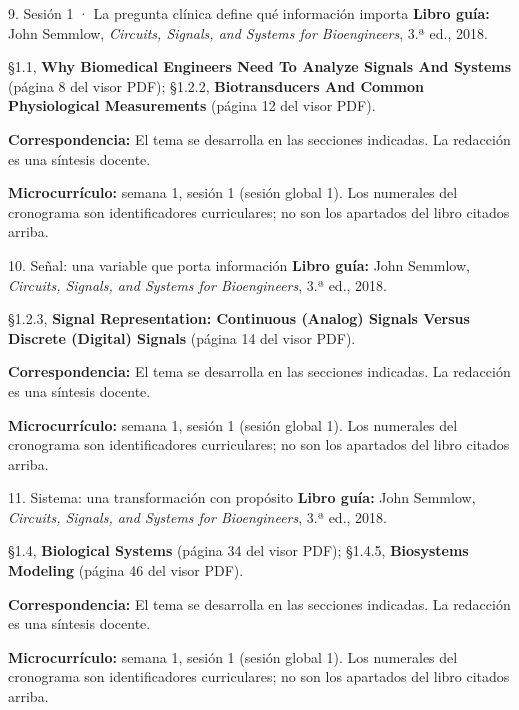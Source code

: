 \documentclass[
  10pt,
  ignorenonframetext,
  aspectratio=169,
  spanish,
]{beamer}
\begin{document}
\begin{frame}{9. Sesión 1 · La pregunta clínica define qué información
importa}
\label{sesiuxf3n-1-la-pregunta-cluxednica-define-quuxe9-informaciuxf3n-importa}
\textbf{Libro guía:} John Semmlow, \emph{Circuits, Signals, and Systems
for Bioengineers}, 3.ª ed., 2018.

§1.1, \textbf{Why Biomedical Engineers Need To Analyze Signals And
Systems} (página 8 del visor PDF); §1.2.2, \textbf{Biotransducers And
Common Physiological Measurements} (página 12 del visor PDF).

\textbf{Correspondencia:} El tema se desarrolla en las secciones
indicadas. La redacción es una síntesis docente.

\textbf{Microcurrículo:} semana 1, sesión 1 (sesión global 1). Los
numerales del cronograma son identificadores curriculares; no son los
apartados del libro citados arriba.
\end{frame}

\begin{frame}{10. Señal: una variable que porta información}
\label{seuxf1al-una-variable-que-porta-informaciuxf3n}
\textbf{Libro guía:} John Semmlow, \emph{Circuits, Signals, and Systems
for Bioengineers}, 3.ª ed., 2018.

§1.2.3, \textbf{Signal Representation: Continuous (Analog) Signals
Versus Discrete (Digital) Signals} (página 14 del visor PDF).

\textbf{Correspondencia:} El tema se desarrolla en las secciones
indicadas. La redacción es una síntesis docente.

\textbf{Microcurrículo:} semana 1, sesión 1 (sesión global 1). Los
numerales del cronograma son identificadores curriculares; no son los
apartados del libro citados arriba.
\end{frame}

\begin{frame}{11. Sistema: una transformación con propósito}
\label{sistema-una-transformaciuxf3n-con-propuxf3sito}
\textbf{Libro guía:} John Semmlow, \emph{Circuits, Signals, and Systems
for Bioengineers}, 3.ª ed., 2018.

§1.4, \textbf{Biological Systems} (página 34 del visor PDF); §1.4.5,
\textbf{Biosystems Modeling} (página 46 del visor PDF).

\textbf{Correspondencia:} El tema se desarrolla en las secciones
indicadas. La redacción es una síntesis docente.

\textbf{Microcurrículo:} semana 1, sesión 1 (sesión global 1). Los
numerales del cronograma son identificadores curriculares; no son los
apartados del libro citados arriba.
\end{frame}
\end{document}
